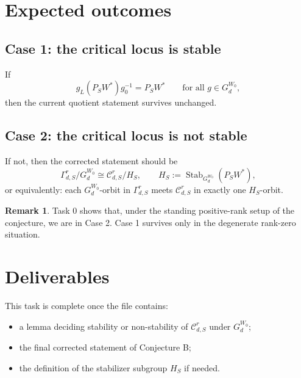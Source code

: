 \documentclass{article}
\newcommand{\Stab}{\operatorname{Stab}}
\theoremstyle{definition}
\newtheorem{remark}[theorem]{Remark}
\begin{document}
\section{Expected outcomes}

\subsection*{Case 1: the critical locus is stable}

If
\[
g_L(P_SW^\ast)g_0^{-1}=P_SW^\ast
\qquad
\text{for all } g\in G_d^{W_0},
\]
then the current quotient statement survives unchanged.

\subsection*{Case 2: the critical locus is not stable}

If not, then the corrected statement should be
\[
\Gamma_{d,S}^r/G_d^{W_0}
\cong
\mathcal C_{d,S}^r/H_S,
\qquad
H_S:=\Stab_{G_d^{W_0}}(P_SW^\ast),
\]
or equivalently:
each $G_d^{W_0}$-orbit in $\Gamma_{d,S}^r$ meets $\mathcal C_{d,S}^r$ in exactly one $H_S$-orbit.

\begin{remark}
Task 0 shows that, under the standing positive-rank setup of the conjecture, we are in Case 2.
Case 1 survives only in the degenerate rank-zero situation.
\end{remark}

\section{Deliverables}

This task is complete once the file contains:

\begin{itemize}
\item a lemma deciding stability or non-stability of $\mathcal C_{d,S}^r$ under $G_d^{W_0}$;
\item the final corrected statement of Conjecture B;
\item the definition of the stabilizer subgroup $H_S$ if needed.
\end{itemize}
\end{document}
